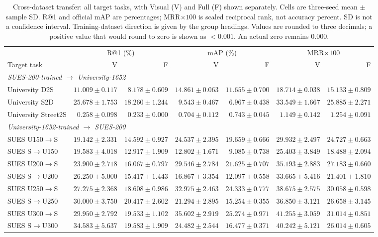 \begin{table}[!t]
\centering
\caption{Cross-dataset transfer: all target tasks, with Visual (V) and Full (F) shown separately. Cells are three-seed mean $\pm$ sample SD. R@1 and official mAP are percentages; MRR$\times100$ is scaled reciprocal rank, not accuracy percent. SD is not a confidence interval. Training-dataset direction is given by the group headings. Values are rounded to three decimals; a positive value that would round to zero is shown as $<0.001$. An actual zero remains 0.000.}
\label{tab:semantic-transfer}
\footnotesize
\setlength{\tabcolsep}{3pt}
\begin{tabular}{lrrrrrr}
\toprule
& \multicolumn{2}{c}{R@1 (\%)} & \multicolumn{2}{c}{mAP (\%)} & \multicolumn{2}{c}{MRR$\times100$} \\
Target task & V & F & V & F & V & F \\
\midrule
\multicolumn{7}{l}{\textit{SUES-200-trained $\to$ University-1652}} \\
University D2S & $11.009\pm0.117$ & $8.178\pm0.609$ & $14.861\pm0.063$ & $11.655\pm0.700$ & $18.714\pm0.038$ & $15.133\pm0.809$ \\
University S2D & $25.678\pm1.753$ & $18.260\pm1.244$ & $9.543\pm0.467$ & $6.967\pm0.438$ & $33.549\pm1.667$ & $25.885\pm2.271$ \\
University Street2S & $0.258\pm0.098$ & $0.233\pm0.000$ & $0.704\pm0.112$ & $0.743\pm0.045$ & $1.149\pm0.142$ & $1.254\pm0.091$ \\
\midrule
\multicolumn{7}{l}{\textit{University-1652-trained $\to$ SUES-200}} \\
SUES U150$\to$S & $19.142\pm2.331$ & $14.592\pm0.927$ & $24.537\pm2.395$ & $19.659\pm0.666$ & $29.932\pm2.497$ & $24.727\pm0.663$ \\
SUES S$\to$U150 & $19.583\pm4.018$ & $12.917\pm1.909$ & $12.802\pm1.671$ & $9.085\pm0.738$ & $25.403\pm3.849$ & $18.488\pm2.094$ \\
SUES U200$\to$S & $23.900\pm2.718$ & $16.067\pm0.797$ & $29.546\pm2.784$ & $21.625\pm0.707$ & $35.193\pm2.883$ & $27.183\pm0.660$ \\
SUES S$\to$U200 & $26.250\pm5.000$ & $15.417\pm1.443$ & $16.867\pm3.354$ & $12.097\pm0.558$ & $33.665\pm5.416$ & $21.401\pm1.810$ \\
SUES U250$\to$S & $27.275\pm2.368$ & $18.608\pm0.986$ & $32.975\pm2.463$ & $24.333\pm0.777$ & $38.675\pm2.575$ & $30.058\pm0.598$ \\
SUES S$\to$U250 & $30.000\pm3.750$ & $20.417\pm2.602$ & $21.294\pm2.895$ & $15.254\pm0.355$ & $36.850\pm3.121$ & $26.658\pm3.145$ \\
SUES U300$\to$S & $29.950\pm2.792$ & $19.533\pm1.102$ & $35.602\pm2.919$ & $25.274\pm0.971$ & $41.255\pm3.059$ & $31.014\pm0.851$ \\
SUES S$\to$U300 & $34.583\pm5.637$ & $19.583\pm1.909$ & $24.482\pm2.544$ & $16.477\pm0.371$ & $40.242\pm5.121$ & $26.014\pm0.605$ \\
\bottomrule
\end{tabular}
\end{table}

